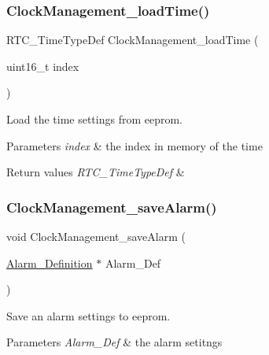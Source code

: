 \subsubsection{\texorpdfstring{Clock\+Management\+\_\+load\+Time()}{ClockManagement\_loadTime()}}
{\footnotesize\ttfamily R\+T\+C\+\_\+\+Time\+Type\+Def Clock\+Management\+\_\+load\+Time (\begin{DoxyParamCaption}\item[{uint16\+\_\+t}]{index }\end{DoxyParamCaption})}



Load the time settings from eeprom. 


\begin{DoxyParams}{Parameters}
{\em index} & the index in memory of the time \\
\hline
\end{DoxyParams}

\begin{DoxyRetVals}{Return values}
{\em R\+T\+C\+\_\+\+Time\+Type\+Def} & \\
\hline
\end{DoxyRetVals}
\mbox{\label{group___clock___management___eeprom_ga693a2219ceebdab80e91367b040c751c}} 
\subsubsection{\texorpdfstring{Clock\+Management\+\_\+save\+Alarm()}{ClockManagement\_saveAlarm()}}
{\footnotesize\ttfamily void Clock\+Management\+\_\+save\+Alarm (\begin{DoxyParamCaption}\item[{\hyperlink{struct_alarm___definition}{Alarm\+\_\+\+Definition} $\ast$}]{Alarm\+\_\+\+Def }\end{DoxyParamCaption})}



Save an alarm settings to eeprom. 


\begin{DoxyParams}{Parameters}
{\em Alarm\+\_\+\+Def} & the alarm setitngs \\
\hline
\end{DoxyParams}

